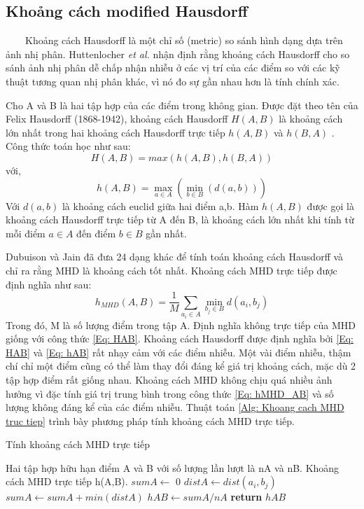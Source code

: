 \documentclass[runningheads]{llncs}
\begin{document}
\subsection{Khoảng cách modified Hausdorff}
\label{ContentS: Khoang cach MHD}
~~~~Khoảng cách Hausdorff là một chỉ số (metric) so sánh hình dạng dựa trên ảnh nhị phân. Huttenlocher \textit{et al.} \cite{huttenlocher1993comparing} nhận định rằng khoảng cách Hausdorff cho so sánh ảnh nhị phân dễ chấp nhận nhiễu ở các vị trí của các điểm so với các kỹ thuật tương quan nhị phân khác, vì nó đo sự gần nhau hơn là tính chính xác. 

Cho A và B là hai tập hợp của các điểm trong không gian. Được đặt theo tên của Felix Hausdorff (1868-1942), khoảng cách Hausdorff $H(A,B)$  là khoảng cách lớn nhất trong hai khoảng cách Hausdorff trực tiếp $h(A,B)$ và $h(B,A)$ . Công thức toán học như sau:
\begin{equation}\label{Eq: HAB}
H(A,B)= max(h(A,B),h(B,A))
\end{equation}
với,
\begin{equation}\label{Eq: hAB}
h(A,B)=\max_{a \in A}(\min_{b \in B}(d(a,b)))
\end{equation}
Với $d(a,b)$  là khoảng cách euclid giữa hai điểm a,b. Hàm $h(A,B)$ được gọi là khoảng cách Hausdorff trực tiếp từ A đến B, là khoảng cách lớn nhất khi tính từ mỗi điểm $a \in A$  đến điểm  $b \in B$ gần nhất.

Dubuison và Jain \cite{dubuisson1994modified} đã đưa 24 dạng khác để tính toán khoảng cách Hausdorff và chỉ ra rằng MHD là khoảng cách tốt nhất. Khoảng cách MHD trực tiếp được định nghĩa như sau:
\begin{equation}
\label{Eq: hMHD_AB}
h_{MHD}(A,B)=\dfrac{1}{M}\sum_{a_{i} \in A}{\min_{b_{j} \in B}{d(a_{i},b_{j})}}
\end{equation}
Trong đó, M là số lượng điểm trong tập A. Định nghĩa không trực tiếp của MHD giống với công thức \ref{Eq: HAB}. Khoảng cách Hausdorff được định nghĩa bởi \ref{Eq: HAB} và \ref{Eq: hAB} rất nhạy cảm với các điểm nhiễu. Một vài điểm nhiễu, thậm chí chỉ một điểm cũng có thể làm thay đổi đáng kể giá trị khoảng cách, mặc dù 2 tập hợp điểm rất giống nhau. Khoảng cách MHD không chịu quá nhiều ảnh hưởng vì đặc tính giá trị trung bình trong công thức \ref{Eq: hMHD_AB} và số lượng không đáng kể của các điểm nhiễu. Thuật toán \ref{Alg: Khoang cach MHD truc tiep} trình bày phương pháp tính khoảng cách MHD trực tiếp.

\begin{algorithm}
\caption{Tính khoảng cách MHD trực tiếp}
\label{Alg: Khoang cach MHD truc tiep}
\begin{algorithmic}[1]
\Require Hai tập hợp hữu hạn điểm A và B với số lượng lần lượt là nA và nB.
\Ensure Khoảng cách MHD trực tiếp h(A,B).
    \State $sumA \gets$ 0
             \State $distA \gets dist(a_i, b_j)$ 
        \EndFor
        \State $sumA \gets sumA + min(distA)$ 
    \EndFor
    \State $hAB \gets sumA / nA$ 
    \State \textbf{return} $hAB$
\end{algorithmic}
\end{algorithm}
\end{document}
